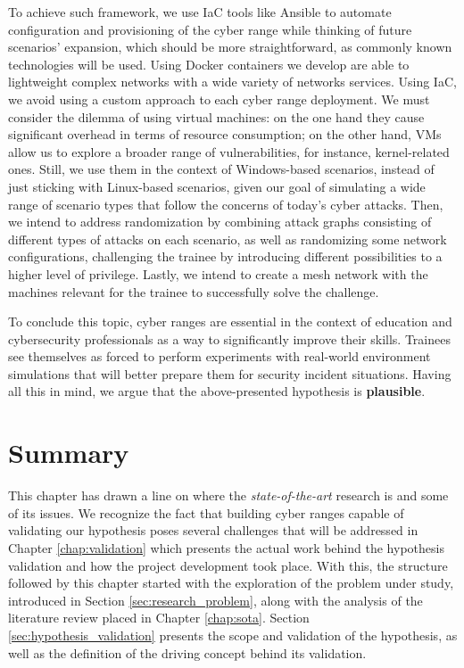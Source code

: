 To achieve such framework, we use IaC tools like Ansible to automate configuration and provisioning of the cyber range while thinking of future scenarios' expansion, which should be more straightforward, as commonly known technologies will be used. Using Docker containers we develop are able to lightweight complex networks with a wide variety of networks services. Using IaC, we avoid using a custom approach to each cyber range deployment. We must consider the dilemma of using virtual machines: on the one hand they cause significant overhead in terms of resource consumption; on the other hand, VMs allow us to explore a broader range of vulnerabilities, for instance, kernel-related ones. Still, we use them in the context of Windows-based scenarios, instead of just sticking with Linux-based scenarios, given our goal of simulating a wide range of scenario types that follow the concerns of today's cyber attacks. Then, we intend to address randomization by combining attack graphs consisting of different types of attacks on each scenario, as well as randomizing some network configurations, challenging the trainee by introducing different possibilities to a higher level of privilege. Lastly, we intend to create a mesh network with the machines relevant for the trainee to successfully solve the challenge.

To conclude this topic, cyber ranges are essential in the context of education and cybersecurity professionals as a way to significantly improve their skills. Trainees see themselves as forced to perform experiments with real-world environment simulations that will better prepare them for security incident situations. Having all this in mind, we argue that the above-presented hypothesis is \textbf{plausible}.

\section{Summary} \label{sec:problem_summary}

This chapter has drawn a line on where the \textit{state-of-the-art} research is and some of its issues. We recognize the fact that building cyber ranges capable of validating our hypothesis poses several challenges that will be addressed in Chapter \ref{chap:validation} which presents the actual work behind the hypothesis validation and how the project development took place. With this, the structure followed by this chapter started with the exploration of the problem under study, introduced in Section \ref{sec:research_problem}, along with the analysis of the literature review placed in Chapter \ref{chap:sota}. Section \ref{sec:hypothesis_validation} presents the scope and validation of the hypothesis, as well as the definition of the driving concept behind its validation.